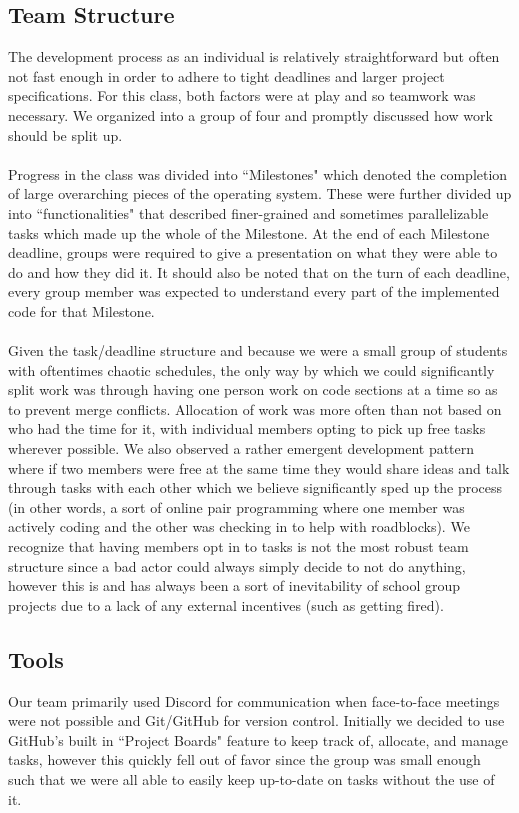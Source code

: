 \subsection{Team Structure}
The development process as an individual is relatively straightforward but often not fast enough in order to adhere to tight deadlines and larger project specifications. For this class, both factors were at play and so teamwork was necessary. We organized into a group of four and promptly discussed how work should be split up.
\\\\
Progress in the class was divided into ``Milestones" which denoted the completion of large overarching pieces of the operating system. These were further divided up into ``functionalities" that described finer-grained and sometimes parallelizable tasks which made up the whole of the Milestone. At the end of each Milestone deadline, groups were required to give a presentation on what they were able to do and how they did it. It should also be noted that on the turn of each deadline, every group member was expected to understand every part of the implemented code for that Milestone.
\\\\
Given the task/deadline structure and because we were a small group of students with oftentimes chaotic schedules, the only way by which we could significantly split work was through having one person work on code sections at a time so as to prevent merge conflicts. Allocation of work was more often than not based on who had the time for it, with individual members opting to pick up free tasks wherever possible. We also observed a rather emergent development pattern where if two members were free at the same time they would share ideas and talk through tasks with each other which we believe significantly sped up the process (in other words, a sort of online pair programming where one member was actively coding and the other was checking in to help with roadblocks). We recognize that having members opt in to tasks is not the most robust team structure since a bad actor could always simply decide to not do anything, however this is and has always been a sort of inevitability of school group projects due to a lack of any external incentives (such as getting fired).

\subsection{Tools}
Our team primarily used Discord for communication when face-to-face meetings were not possible and Git/GitHub for version control. Initially we decided to use GitHub's built in ``Project Boards" feature to keep track of, allocate, and manage tasks, however this quickly fell out of favor since the group was small enough such that we were all able to easily keep up-to-date on tasks without the use of it.
